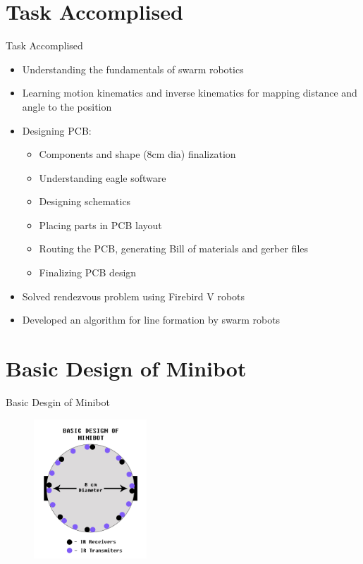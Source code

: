 \documentclass[10pt, a4paper]{beamer}
\begin{document}
\section{Task Accomplised}
\begin{frame}{Task Accomplised}
	\begin{itemize}
		\setlength\itemsep{-0.5em}
		\item Understanding the fundamentals of swarm robotics
		\item Learning motion kinematics and inverse kinematics for mapping distance and angle to the position
		\item Designing PCB:
		\begin{itemize}
			\setlength\itemsep{-1em}
			\item Components and shape (8cm dia) finalization
			\item Understanding eagle software
			\item Designing schematics
			\item Placing parts in PCB layout
			\item Routing the PCB, generating Bill of materials and gerber files
			\item Finalizing PCB design
		\end{itemize}
		\item Solved rendezvous problem using Firebird V robots
		\item Developed an algorithm for line formation by swarm robots
	\end{itemize}
\end{frame}

\section{Basic Design of Minibot}
\begin{frame}{Basic Desgin of Minibot}
	\begin{figure}
		\includegraphics[width=160px]{basic_design.jpg}
		\label{fig:Design}
	\end{figure}
\end{frame}
\end{document}
